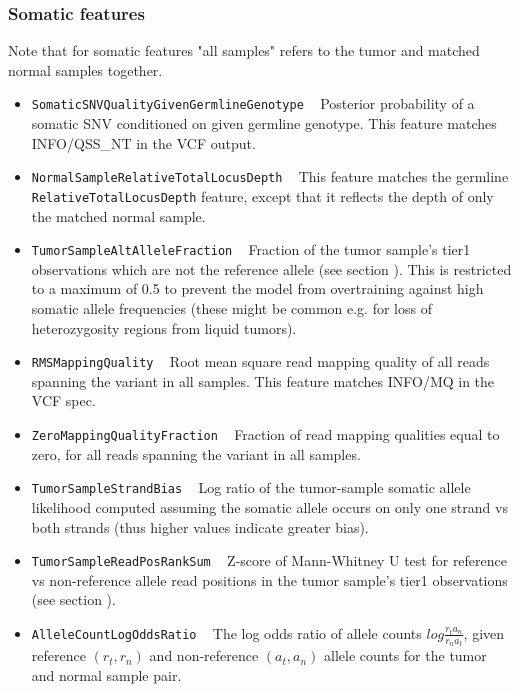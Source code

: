 \documentclass{article}
\begin{document}
\subsubsection{Somatic features}

Note that for somatic features "all samples" refers to the tumor and matched normal samples together.

\begin{itemize}

    \item \texttt{SomaticSNVQualityGivenGermlineGenotype} ~ Posterior probability of a somatic SNV conditioned on given germline genotype. This feature matches INFO/QSS\_NT in the VCF output.

    \item \texttt{NormalSampleRelativeTotalLocusDepth} ~ This feature matches the germline \texttt{RelativeTotalLocusDepth} feature, except that it reflects the depth of only the matched normal sample.

    \item \texttt{TumorSampleAltAlleleFraction} ~ Fraction of the tumor sample's tier1 observations which are not the reference allele (see section ). This is restricted to a maximum of 0.5 to prevent the model from overtraining against high somatic allele frequencies (these might be common e.g. for loss of heterozygosity regions from liquid tumors).

    \item \texttt{RMSMappingQuality} ~ Root mean square read mapping quality of all reads spanning the variant in all samples. This feature matches INFO/MQ in the VCF spec.

    \item \texttt{ZeroMappingQualityFraction} ~ Fraction of read mapping qualities equal to zero, for all reads spanning the variant in all samples.

    \item \texttt{TumorSampleStrandBias} ~ Log ratio of the tumor-sample somatic allele likelihood computed assuming the somatic allele occurs on only one strand vs both strands
    (thus higher values indicate greater bias).

    \item \texttt{TumorSampleReadPosRankSum} ~ Z-score of Mann-Whitney U test for reference vs non-reference allele read positions in the tumor sample's tier1 observations (see section ).

    \item \texttt{AlleleCountLogOddsRatio} ~ The log odds ratio of allele counts $log{\frac{r_t a_n} {r_n a_t}}$, given reference $(r_t,r_n)$ and non-reference $(a_t,a_n)$ allele counts for the tumor and normal sample pair.


\end{itemize}
\end{document}
